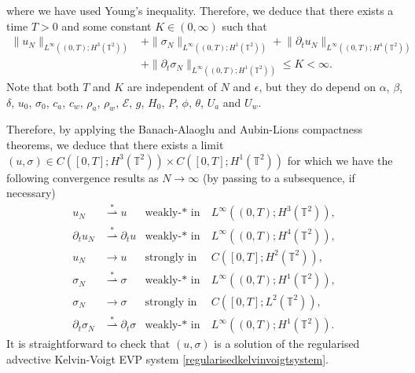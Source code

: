 \documentclass[12pt,a4paper]{article}
\theoremstyle{definition}
\theoremstyle{remark}
\numberwithin{equation}{section}
\begin{document}
where we have used Young's inequality. Therefore, we deduce that there exists a time $T > 0$ and some constant $K \in (0, \infty)$ such that
\begin{align*}
\lVert u_N \rVert_{L^\infty ((0,T); H^3 (\mathbb{T}^2))} &+ \lVert \sigma_N \rVert_{L^\infty ((0,T); H^1 (\mathbb{T}^2))} + \lVert \partial_t u_N \rVert_{L^\infty ((0,T); H^4 (\mathbb{T}^2))} \\
&+ \lVert \partial_t \sigma_N \rVert_{L^\infty ((0,T); H^1 (\mathbb{T}^2))} \leq K < \infty.
\end{align*}
Note that both $T$ and $K$ are independent of $N$ and $\epsilon$, but they do depend on $\alpha$, $\beta$, $\delta$, $u_0$, $\sigma_0$, $c_a$, $c_w$, $\rho_a$, $\rho_w$, $\mathcal{E}$, $g$, $H_0$, $P$, $\phi$, $\theta$, $U_a$ and $U_w$.

Therefore, by applying the Banach-Alaoglu and Aubin-Lions compactness theorems, we deduce that there exists a limit $(u,\sigma) \in C([0,T];H^3 (\mathbb{T}^2)) \times C([0,T];H^1(\mathbb{T}^2))$ for which we have the following convergence results as $N \rightarrow \infty$ (by passing to a subsequence, if necessary)
\begin{align}
    u_N & \overset{\ast}{\rightharpoonup} u &  \text{weakly-$* $ in}& ~ L^\infty ((0,T);H^3 (\mathbb{T}^2)), \\
    \partial_t u_N & \overset{\ast}{\rightharpoonup} \partial_t u &  \text{weakly-$* $ in}& ~ L^\infty ((0,T);H^4 (\mathbb{T}^2)),  \\
    u_N & \rightarrow u & \text{strongly in}& ~ C([0,T];H^2(\mathbb T^2)), \\
    \sigma_N &\overset{\ast}{\rightharpoonup} \sigma & \text{weakly-$* $ in}& ~ L^\infty ((0,T);H^1 (\mathbb{T}^2)), \\
    \sigma_N &\rightarrow \sigma & \text{strongly in}& ~ C([0,T];L^2(\mathbb T^2)),\\
    \partial_t \sigma_N & \overset{\ast}{\rightharpoonup} \partial_t \sigma & \text{weakly-$* $ in}& ~ L^\infty ((0,T);H^1 (\mathbb{T}^2)).
\end{align}
It is straightforward to check that $(u,\sigma)$ is a solution of the regularised advective Kelvin-Voigt EVP system \eqref{regularisedkelvinvoigtsystem}. 
\end{document}
